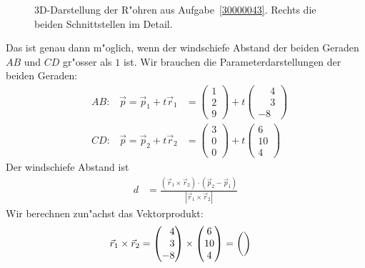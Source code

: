 \begin{loesung}
\begin{figure}
\caption{3D-Darstellung der R"ohren aus Aufgabe~\ref{30000043}.
Rechts die beiden Schnittstellen im Detail.
\label{30000043:tubes}}
\end{figure}
Das ist genau dann m"oglich, wenn der windschiefe Abstand der beiden
Geraden $AB$ und $CD$ gr"osser als $1$ ist.
Wir brauchen die Parameterdarstellungen der beiden Geraden:
\[
\begin{aligned}
&AB:&\vec{p}=\vec{p}_1+t\vec{r}_1
&=
\begin{pmatrix}1\\2\\9\end{pmatrix} + t\begin{pmatrix}\phantom{-}4\\\phantom{-}3\\-8\end{pmatrix}
\\
&CD:&\vec{p}=\vec{p}_2+t\vec{r}_2
&=
\begin{pmatrix}3\\0\\0\end{pmatrix} + t\begin{pmatrix}6\\10\\4\end{pmatrix}
\end{aligned}
\]
Der windschiefe Abstand ist
\begin{align*}
d
&=
\frac{(\vec{r}_1\times\vec{r}_2)\cdot (\vec{p}_2 - \vec{p}_1)}{|\vec{r}_1\times \vec{r}_2|}
\end{align*}
Wir berechnen zun"achst das Vektorprodukt:
\begin{align*}
\vec{r}_1\times \vec{r}_2
&=
\begin{pmatrix}\phantom{-}4\\\phantom{-}3\\-8\end{pmatrix}
\times
\begin{pmatrix}6\\10\\4\end{pmatrix}
=
{\def\arraystretch{2.2}
\begin{pmatrix}
{\def\arraystretch{1.0}
}
\end{pmatrix}}
\end{align*}
\end{loesung}
